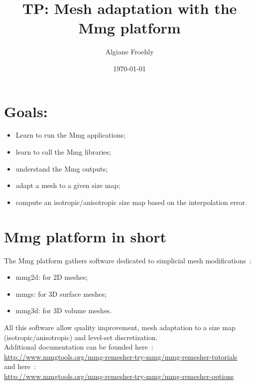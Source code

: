 \documentclass{article}
\author{Algiane Froehly}
\date{\today}
\title{TP: Mesh adaptation with the Mmg platform}
\begin{document}
\maketitle

\date{}

\section{Goals:}
\begin{itemize}
\item Learn to run the Mmg applications;
\item learn to call the Mmg libraries;
\item understand the Mmg outputs;
\item adapt a mesh to a given size map;
\item compute an isotropic/anisotropic size map based on the interpolation error.
\end{itemize}

\section{Mmg platform in short}
The Mmg platform gathers software dedicated to simplicial mesh modifications~:
\begin{itemize}
\item mmg2d: for 2D meshes;
\item mmgs: for 3D surface meshes;
\item mmg3d: for 3D volume meshes.
\end{itemize}
All this software allow quality improvement, mesh adaptation to a size
map (isotropic/anisotropic) and level-set discretization.\\

Additional documentation can be founded here~:\\
\url{http://www.mmgtools.org/mmg-remesher-try-mmg/mmg-remesher-tutorials}
\\and here~:\\
\url{http://www.mmgtools.org/mmg-remesher-try-mmg/mmg-remesher-options}
\end{document}
